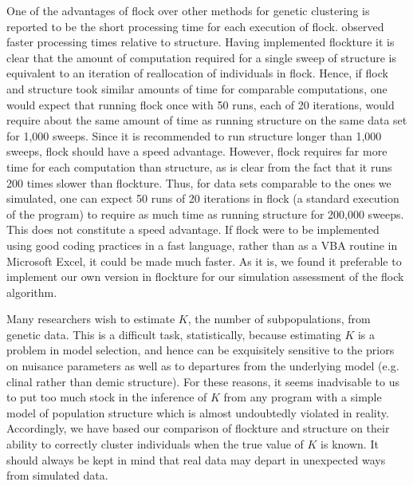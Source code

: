 One of the advantages of {\sc flock} over other methods for genetic clustering
is reported to be the short processing time for each execution of {\sc flock}.
\citet{Duc&Tur2012} observed faster processing times relative to {\sc structure}.
Having implemented {\sc flockture} it is clear that the amount of computation required for a
single sweep of {\sc structure} is equivalent to an iteration of reallocation of individuals
in {\sc flock}.
Hence, if {\sc flock} and {\sc structure} took similar amounts of time for comparable
computations, one would expect that running flock once with 50 runs, each of 20 iterations,
would require about the same amount of time as running {\sc structure} on the same
data set for 1,000 sweeps.  Since it is recommended to run {\sc structure} longer than 1,000 sweeps, {\sc flock} should have a speed advantage. However, {\sc flock} requires far more 
time for each computation
than {\sc structure}, as is clear from the fact that it runs 200 times slower than 
{\sc flockture}.  Thus, for data sets comparable to the ones we simulated, one can expect
50 runs of 20 iterations in {\sc flock} (a standard execution of the program) to require as
much time as running {\sc structure} for 200,000 sweeps. This does not constitute
a speed advantage.
If {\sc flock} were to be implemented using good coding practices in a fast language,
rather than as a VBA routine in Microsoft Excel,
it could be made much faster. As it is, we found it preferable to implement our own version
in {\sc flockture} for our simulation assessment of the {\sc flock} algorithm.


Many researchers wish to estimate $K$, the number of subpopulations, from genetic data.  This is
a difficult task, statistically, because estimating $K$ is a problem in model selection, and hence can
be exquisitely sensitive to the priors on nuisance parameters as well as to departures from the underlying
model (e.g. clinal rather than demic structure). For these reasons, it seems inadvisable to us to
put too much stock in the inference of $K$ from any program with a simple model of population structure which
is almost undoubtedly violated in reality. Accordingly, we have based our comparison of 
{\sc flockture} and {\sc structure} on their ability to correctly cluster individuals when the true value
of $K$ is known. It should always be kept in mind that real data may depart in unexpected ways from
simulated data. 


